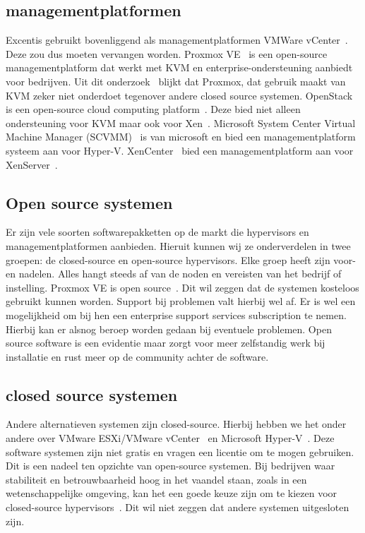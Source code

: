\subsection{managementplatformen}
Excentis gebruikt bovenliggend als managementplatformen VMWare vCenter~\autocite{vmware}. Deze zou dus moeten vervangen worden.
Proxmox VE~\autocite{Proxmox} is een open-source managementplatform dat werkt met KVM en enterprise-ondersteuning aanbiedt voor bedrijven. Uit dit onderzoek~\autocite{ally2018comparative} blijkt dat Proxmox, dat gebruik maakt van KVM zeker niet onderdoet tegenover andere closed source systemen.
OpenStack is een open-source cloud computing platform~\autocite{openstack2024}. Deze bied niet alleen ondersteuning voor KVM maar ook voor Xen~\autocite{oleksiuk2023comparative}.
Microsoft System Center Virtual Machine Manager (SCVMM)~\autocite{microsoftvmm2025} is van microsoft en bied een managementplatform systeem aan voor Hyper-V.
XenCenter~\autocite{xencenter2024} bied een managementplatform aan voor XenServer~\autocite{xenserver}.

\subsection{Open source systemen}
Er zijn vele soorten softwarepakketten op de markt die hypervisors en managementplatformen aanbieden. Hieruit kunnen wij ze onderverdelen in twee groepen: de closed-source en open-source hypervisors. Elke groep heeft zijn voor- en nadelen. Alles hangt steeds af van de noden en vereisten van het bedrijf of instelling.
Proxmox VE is open source~\autocite{Proxmox}. Dit wil zeggen dat de systemen kosteloos gebruikt kunnen worden. Support bij problemen valt hierbij wel af. Er is wel een mogelijkheid om bij hen een enterprise support services subscription te nemen. Hierbij kan er alsnog beroep worden gedaan bij eventuele problemen.
Open source software is een evidentie maar zorgt voor meer zelfstandig werk bij installatie en rust meer op de community achter de software.

\subsection{closed source systemen}
Andere alternatieven systemen zijn closed-source. Hierbij hebben we het onder andere over VMware ESXi/VMware vCenter~\autocite{vmware} en Microsoft Hyper-V~\autocite{Eaton2019}. Deze software systemen zijn niet gratis en vragen een licentie om te mogen gebruiken. Dit is een nadeel ten opzichte van open-source systemen.
Bij bedrijven waar stabiliteit en betrouwbaarheid hoog in het vaandel staan, zoals in een wetenschappelijke omgeving, kan het een goede keuze zijn om te kiezen voor closed-source hypervisors~\autocite{voras2012early}. Dit wil niet zeggen dat andere systemen uitgesloten zijn.
